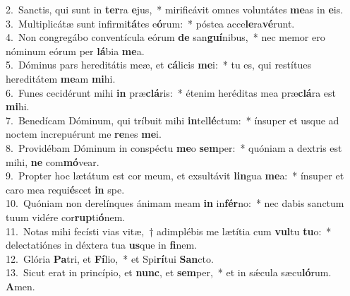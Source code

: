 {2.~}Sanctis, qui sunt in \textbf{ter}ra \textbf{e}jus,~* mirificávit omnes voluntátes \textbf{me}as in \textbf{e}is.\\
{3.~}Multiplicátæ sunt infirmi\textbf{tá}tes e\textbf{ó}rum:~* póstea acce\textbf{le}ra\textbf{vé}runt.\\
{4.~}Non congregábo conventícula eórum \textbf{de} san\textbf{guí}nibus,~* nec memor ero nóminum eórum per \textbf{lá}bia \textbf{me}a.\\
{5.~}Dóminus pars hereditátis meæ, et \textbf{cá}licis \textbf{me}i:~* tu es, qui restítues hereditátem \textbf{me}am \textbf{mi}hi.\\
{6.~}Funes cecidérunt mihi \textbf{in} præ\textbf{clá}ris:~* étenim heréditas mea præ\textbf{clá}ra est \textbf{mi}hi.\\
{7.~}Benedícam Dóminum, qui tríbuit mihi \textbf{in}tel\textbf{lé}ctum:~* ínsuper et usque ad noctem increpuérunt me \textbf{re}nes \textbf{me}i.\\
{8.~}Providébam Dóminum in conspéctu \textbf{me}o \textbf{sem}per:~* quóniam a dextris est mihi, \textbf{ne} com\textbf{mó}vear.\\
{9.~}Propter hoc lætátum est cor meum, et exsultávit \textbf{lin}gua \textbf{me}a:~* ínsuper et caro mea requi\textbf{é}scet \textbf{in} spe.\\
{10.~}Quóniam non derelínques ánimam meam \textbf{in} in\textbf{fér}no:~* nec dabis sanctum tuum vidére cor\textbf{rup}ti\textbf{ó}nem.\\
{11.~}Notas mihi fecísti vias vitæ,~† adimplébis me lætítia cum \textbf{vul}tu \textbf{tu}o:~* delectatiónes in déxtera tua \textbf{us}que in \textbf{fi}nem.\\
{12.~}Glória \textbf{Pa}tri, et \textbf{Fí}lio,~* et Spi\textbf{rí}tui \textbf{San}cto.\\
{13.~}Sicut erat in princípio, et \textbf{nunc}, et \textbf{sem}per,~* et in sǽcula sæcu\textbf{ló}rum. \textbf{A}men.\\
